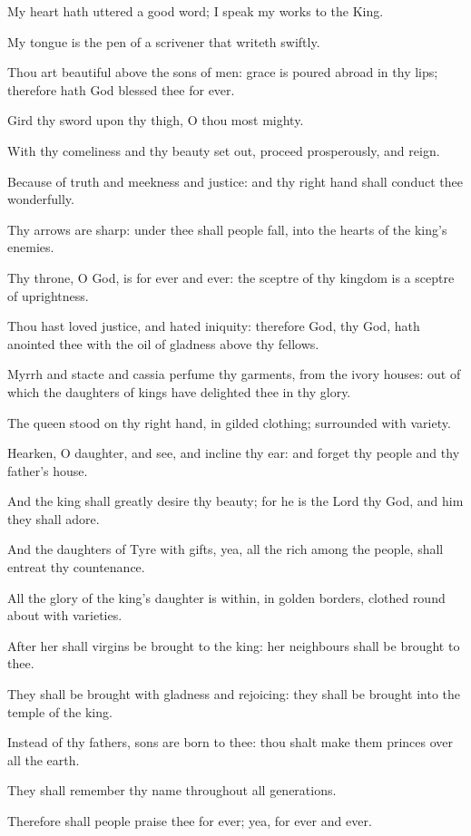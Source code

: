 ﻿\item My heart hath uttered a good word; I speak my works to the King.
\item My tongue is the pen of a scrivener that writeth swiftly.
\item Thou art beautiful above the sons of men: grace is poured abroad in thy lips; therefore hath God blessed thee for ever.
\item Gird thy sword upon thy thigh, O thou most mighty.
\item With thy comeliness and thy beauty set out, proceed prosperously, and reign.
\item Because of truth and meekness and justice: and thy right hand shall conduct thee wonderfully.
\item Thy arrows are sharp: under thee shall people fall, into the hearts of the king's enemies.
\item Thy throne, O God, is for ever and ever: the sceptre of thy kingdom is a sceptre of uprightness.
\item Thou hast loved justice, and hated iniquity: therefore God, thy God, hath anointed thee with the oil of gladness above thy fellows.
\item Myrrh and stacte and cassia perfume thy garments, from the ivory houses: out of which the daughters of kings have delighted thee in thy glory.
\item The queen stood on thy right hand, in gilded clothing; surrounded with variety.
\item Hearken, O daughter, and see, and incline thy ear: and forget thy people and thy father's house.
\item And the king shall greatly desire thy beauty; for he is the Lord thy God, and him they shall adore.
\item And the daughters of Tyre with gifts, yea, all the rich among the people, shall entreat thy countenance.
\item All the glory of the king's daughter is within, in golden borders, clothed round about with varieties.
\item After her shall virgins be brought to the king: her neighbours shall be brought to thee.
\item They shall be brought with gladness and rejoicing: they shall be brought into the temple of the king.
\item Instead of thy fathers, sons are born to thee: thou shalt make them princes over all the earth.
\item They shall remember thy name throughout all generations.
\item Therefore shall people praise thee for ever; yea, for ever and ever.